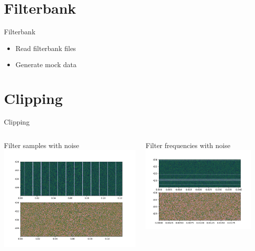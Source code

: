 \documentclass{beamer}
\begin{document}
\section{Filterbank}
\begin{frame}{Filterbank}
	\begin{itemize}
		\item Read filterbank files
		\item Generate mock data
	\end{itemize}
\end{frame}

\section{Clipping}
\begin{frame}{Clipping}
	\begin{columns}
		\begin{column}{0.5\textwidth}
			Filter samples with noise
			\includegraphics[width=\columnwidth]{filter_samples}
		\end{column}
		\begin{column}{0.5\textwidth}
			Filter frequencies with noise
			\includegraphics[width=\columnwidth]{filter_freqs}
		\end{column}
	\end{columns}
\end{frame}
\end{document}
